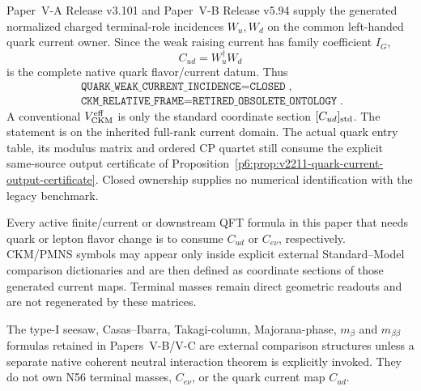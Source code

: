\documentclass[12pt,a4paper]{article}
\begin{document}
\begin{theorem}
\label{p7v2:thm:v268-generated-quark-current}
Paper~V-A Release v3.101 and Paper~V-B Release v5.94 supply the generated
normalized charged terminal-role incidences $W_u,W_d$ on the common
left-handed quark current owner.  Since the weak raising current has family
coefficient $I_G$,
\[
 \boxed{C_{ud}=W_u^\dagger W_d}
\]
is the complete native quark flavor/current datum.  Thus
\[
\begin{gathered}
 \boxed{\texttt{QUARK\_WEAK\_CURRENT\_INCIDENCE}=\texttt{CLOSED}},\\[3pt]
 \boxed{\texttt{CKM\_RELATIVE\_FRAME}=\texttt{RETIRED\_OBSOLETE\_ONTOLOGY}}.
\end{gathered}
\]
A conventional $V_{\rm CKM}^{\rm eff}$ is only the standard coordinate
section $[C_{ud}]_{\rm std}$.
The statement is on the inherited full-rank current domain.  The actual
quark entry table, its modulus matrix and ordered CP quartet still consume
the explicit same-source output certificate of
Proposition~\ref{p6:prop:v2211-quark-current-output-certificate}.  Closed
ownership supplies no numerical identification with the legacy benchmark.
\end{theorem}

\begin{corollary}
\label{p7v2:cor:v268-flavor-sensitive-current-rule}
Every active finite/current or downstream QFT formula in this paper that
needs quark or lepton flavor change is to consume $C_{ud}$ or $C_{e\nu}$,
respectively.  CKM/PMNS symbols may appear only inside explicit external
Standard--Model comparison dictionaries and are then defined as coordinate
sections of those generated current maps.  Terminal masses remain direct
geometric readouts and are not regenerated by these matrices.
\end{corollary}

\begin{remark}
\label{p7v2:rem:v268-majorana-seesaw-scope}
The type-I seesaw, Casas--Ibarra, Takagi-column, Majorana-phase,
$m_\beta$ and $m_{\beta\beta}$ formulas retained in Papers~V-B/V-C are
external comparison structures unless a separate native coherent neutral
interaction theorem is explicitly invoked.  They do not own N56 terminal
masses, $C_{e\nu}$, or the quark current map $C_{ud}$.
\end{remark}
\end{document}
